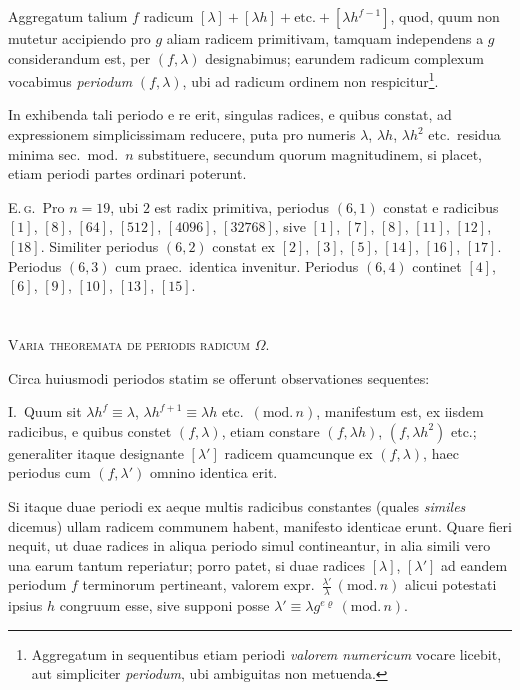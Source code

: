 \documentclass[12pt,a4paper]{article}
\theoremstyle{plain}
\theoremstyle{definition}
\theoremstyle{remark}
\begin{document}
Aggregatum talium $f$ radicum $[\lambda]+[\lambda h]+\text{etc.}+[\lambda h^{f-1}]$, quod, quum non mutetur accipiendo pro $g$ aliam radicem primitivam, tamquam independens a $g$ considerandum est, per $(f,\lambda)$ designabimus; earundem radicum complexum vocabimus \emph{periodum} $(f,\lambda)$, ubi ad radicum ordinem non respicitur\footnote{Aggregatum in sequentibus etiam periodi \emph{valorem numericum} vocare licebit, aut simpliciter \emph{periodum}, ubi ambiguitas non metuenda.}.

In exhibenda tali periodo e re erit, singulas radices, e quibus constat, ad expressionem simplicissimam reducere, puta pro numeris $\lambda$, $\lambda h$, $\lambda h^2$ etc.\ residua minima sec.\ mod.\ $n$ substituere, secundum quorum magnitudinem, si placet, etiam periodi partes ordinari poterunt.

\textsc{E.\,g.}\ Pro $n=19$, ubi $2$ est radix primitiva, periodus $(6,1)$ constat e radicibus $[1]$, $[8]$, $[64]$, $[512]$, $[4096]$, $[32768]$, sive $[1]$, $[7]$, $[8]$, $[11]$, $[12]$, $[18]$. Similiter periodus $(6,2)$ constat ex $[2]$, $[3]$, $[5]$, $[14]$, $[16]$, $[17]$. Periodus $(6,3)$ cum praec.\ identica invenitur. Periodus $(6,4)$ continet $[4]$, $[6]$, $[9]$, $[10]$, $[13]$, $[15]$.

\section{}

\textsc{Varia theoremata de periodis radicum $\Omega$.}

Circa huiusmodi periodos statim se offerunt observationes sequentes:

\textsc{I.}\ Quum sit $\lambda h^f\equiv\lambda$, $\lambda h^{f+1}\equiv\lambda h$ etc.\ $(\mathrm{mod.}\,n)$, manifestum est, ex iisdem radicibus, e quibus constet $(f,\lambda)$, etiam constare $(f,\lambda h)$, $(f,\lambda h^2)$ etc.; generaliter itaque designante $[\lambda']$ radicem quamcunque ex $(f,\lambda)$, haec periodus cum $(f,\lambda')$ omnino identica erit.

Si itaque duae periodi ex aeque multis radicibus constantes (quales \emph{similes} dicemus) ullam radicem communem habent, manifesto identicae erunt. Quare fieri nequit, ut duae radices in aliqua periodo simul contineantur, in alia simili vero una earum tantum reperiatur; porro patet, si duae radices $[\lambda]$, $[\lambda']$ ad eandem periodum $f$ terminorum pertineant, valorem expr.~$\frac{\lambda'}{\lambda}\,(\mathrm{mod.}\,n)$ alicui potestati ipsius $h$ congruum esse, sive supponi posse $\lambda'\equiv\lambda g^{e\varrho}\,(\mathrm{mod.}\,n)$.
\end{document}
